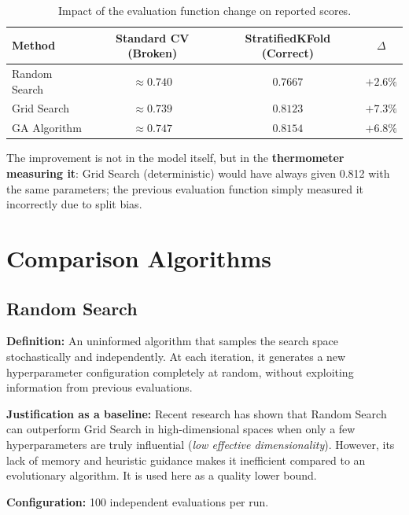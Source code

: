 \documentclass[12pt, a4paper]{article}
\begin{document}
\renewcommand{\arraystretch}{1.3}
\begin{table}[H]
  \centering
  \caption{Impact of the evaluation function change on reported scores.}
  \label{tab:impact_cv}
  \begin{tabular}{lccc}
    \toprule
    \textbf{Method} & \textbf{Standard CV (Broken)} & \textbf{StratifiedKFold (Correct)} & \textbf{$\Delta$} \\
    \midrule
    Random Search   & $\approx 0.740$             & $0.7667$                            & $+2.6\%$          \\
    Grid Search     & $\approx 0.739$             & $0.8123$                            & $+7.3\%$          \\
    GA Algorithm    & $\approx 0.747$             & $\mathbf{0.8154}$                   & $+6.8\%$          \\
    \bottomrule
  \end{tabular}
\end{table}
\renewcommand{\arraystretch}{1}

The improvement is not in the model itself, but in the \textbf{thermometer measuring it}:
Grid Search (deterministic) would have always given 0.812 with the same parameters;
the previous evaluation function simply measured it incorrectly due to split bias.

\section{Comparison Algorithms}

\subsection{Random Search}

\textbf{Definition:} An uninformed algorithm that samples the search space
stochastically and independently. At each iteration, it generates a new hyperparameter
configuration completely at random, without exploiting information from previous
evaluations.

\textbf{Justification as a baseline:} Recent research has shown that Random Search
can outperform Grid Search in high-dimensional spaces when only a few hyperparameters
are truly influential (\textit{low effective dimensionality}). However, its lack of
memory and heuristic guidance makes it inefficient compared to an evolutionary
algorithm. It is used here as a quality lower bound.

\textbf{Configuration:} 100 independent evaluations per run.
\end{document}
